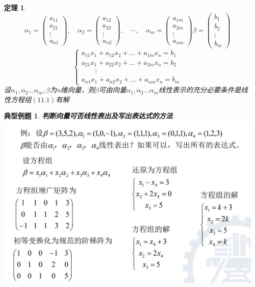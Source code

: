 \documentclass[12pt,oneside]{ctexbook}
\newtheorem{theorem}[subsection]{定理}
\newtheorem{problem}[subsection]{典型例题}
\begin{document}
\begin{theorem}
    \[\alpha_1=\begin{pmatrix}
        a_{11}
        \\a_{21}
        \\ \vdots
        \\a_{n1}
    \end{pmatrix},\quad
    \alpha_2=\begin{pmatrix}
        a_{12}
        \\a_{22}
        \\ \vdots
        \\a_{n2}
    \end{pmatrix},\quad
    \cdots,\quad
    \alpha_m=\begin{pmatrix}
        a_{1m}
        \\a_{2m}
        \\ \vdots
        \\a_{nm}
    \end{pmatrix}
    \beta=
    \begin{pmatrix}
        b_1
        \\b_2
        \\ \vdots
        \\b_m
    \end{pmatrix}
    \]
    \[\begin{cases}\tag{11.1}
        a_{11}x_1 + a_{12}x_2 + \dots + a_{1m}x_n = b_1\\
        a_{21}x_1 + a_{22}x_2 + \dots + a_{2m}x_n = b_2\\
        \quad\quad\vdots \\
        a_{n1}x_1 + a_{n2}x_2 + \dots + a_{nm}x_n = b_m
    \end{cases}
    \]
    设\(\alpha_1,\alpha_2 \dots \alpha_m,\beta \)为n维向量，则\(\beta\)可由向量\(\alpha_1,\alpha_2 \dots \alpha_m\)线性表示的充分必要条件是线性方程组\((11.1)\)有解
\end{theorem}
\begin{problem}
    \textbf{判断向量可否线性表出及写出表达式的方法}
    \\
    \includegraphics[scale=0.6]{problem3.1.png}
\end{problem}
\end{document}
